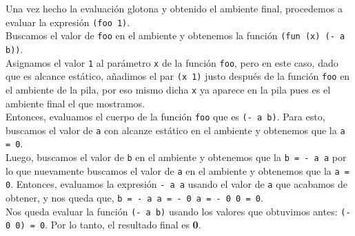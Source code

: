 \documentclass[11pt]{article}
\begin{document}
\begin{enumerate}[leftmargin=0.8cm]
\begin{itemize}
\begin{center}
        \end{center}

        Una vez hecho la evaluación glotona y obtenido el ambiente final, procedemos a evaluar la expresión \texttt{(foo 1)}.\\
        Buscamos el valor de \texttt{foo} en el ambiente y obtenemos la función \texttt{(fun (x) (- a b))}.\\
        Asignamos el valor \texttt{1} al parámetro \texttt{x} de la función \texttt{foo}, pero en este caso, dado que es alcance estático, añadimos el par \texttt{(x 1)} justo después de la función \texttt{foo} en el ambiente de la pila, por eso mismo dicha \texttt{x} ya aparece en la pila pues es el ambiente final el que mostramos.\\
        Entonces, evaluamos el cuerpo de la función \texttt{foo} que es \texttt{(- a b)}. Para esto, buscamos el valor de \texttt{a} con alcanze estático en el ambiente y obtenemos que la \texttt{a = 0}.\\ 
        Luego, buscamos el valor de \texttt{b} en el ambiente y obtenemos que la \texttt{b = - a a} por lo que nuevamente buscamos el valor de \texttt{a} en el ambiente y obtenemos que la \texttt{a = 0}. Entonces, evaluamos la expresión \texttt{- a a} usando el valor de \texttt{a} que acabamos de obtener, y nos queda que, \texttt{b = - a a = - 0 a = - 0 0 = 0}.\\
        Nos queda evaluar la función \texttt{(- a b)} usando los valores que obtuvimos antes: \texttt{(- 0 0) = 0}. Por lo tanto, el resultado final es \textbf{0}.\\


\end{itemize}
\end{enumerate}
\end{document}
